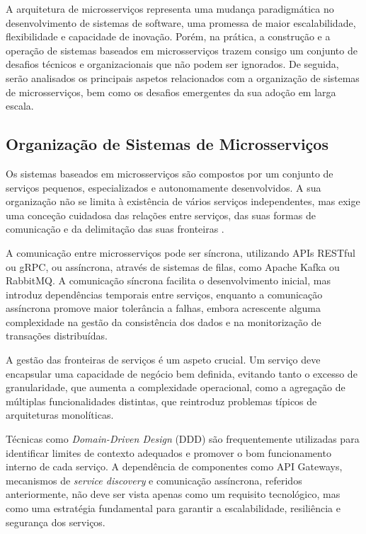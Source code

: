 A arquitetura de microsserviços representa uma mudança paradigmática no desenvolvimento de sistemas de software, uma promessa de maior escalabilidade, flexibilidade e capacidade de inovação. Porém, na prática, a construção e a operação de sistemas baseados em microsserviços trazem consigo um conjunto de desafios técnicos e organizacionais que não podem ser ignorados. De seguida, serão analisados os principais aspetos relacionados com a organização de sistemas de microsserviços, bem como os desafios emergentes da sua adoção em larga escala.

\subsection{Organização de Sistemas de Microsserviços}

Os sistemas baseados em microsserviços são compostos por um conjunto de serviços pequenos, especializados e autonomamente desenvolvidos. A sua organização não se limita à existência de vários serviços independentes, mas exige uma conceção cuidadosa das relações entre serviços, das suas formas de comunicação e da delimitação das suas fronteiras \cite{Railic2021,Lewis2014}. 

A comunicação entre microsserviços pode ser síncrona, utilizando APIs RESTful ou gRPC, ou assíncrona, através de sistemas de filas, como Apache Kafka ou RabbitMQ. A comunicação síncrona facilita o desenvolvimento inicial, mas introduz dependências temporais entre serviços, enquanto a comunicação assíncrona promove maior tolerância a falhas, embora acrescente alguma complexidade na gestão da consistência dos dados e na monitorização de transações distribuídas.

A gestão das fronteiras de serviços é um aspeto crucial. Um serviço deve encapsular uma capacidade de negócio bem definida, evitando tanto o excesso de granularidade, que aumenta a complexidade operacional, como a agregação de múltiplas funcionalidades distintas, que reintroduz problemas típicos de arquiteturas monolíticas.

Técnicas como \textit{Domain-Driven Design} (DDD) \cite{Rogers2022} são frequentemente utilizadas para identificar limites de contexto adequados e promover o bom funcionamento interno de cada serviço. A dependência de componentes como API Gateways, mecanismos de \textit{service discovery} e comunicação assíncrona, referidos anteriormente, não deve ser vista apenas como um requisito tecnológico, mas como uma estratégia fundamental para garantir a escalabilidade, resiliência e segurança dos serviços.

